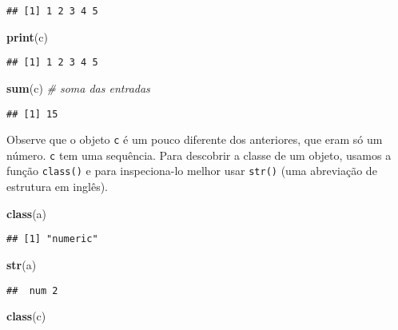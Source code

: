 \documentclass[]{article}
\newenvironment{Shaded}{\begin{snugshade}}{\end{snugshade}}
\newcommand{\CommentTok}[1]{\textcolor[rgb]{0.56,0.35,0.01}{\textit{#1}}}
\newcommand{\KeywordTok}[1]{\textcolor[rgb]{0.13,0.29,0.53}{\textbf{#1}}}
\newcommand{\NormalTok}[1]{#1}
\begin{document}
\begin{verbatim}
## [1] 1 2 3 4 5
\end{verbatim}

\begin{Shaded}
\begin{Highlighting}[]
\KeywordTok{print}\NormalTok{(c)}
\end{Highlighting}
\end{Shaded}

\begin{verbatim}
## [1] 1 2 3 4 5
\end{verbatim}

\begin{Shaded}
\begin{Highlighting}[]
\KeywordTok{sum}\NormalTok{(c) }\CommentTok{# soma das entradas}
\end{Highlighting}
\end{Shaded}

\begin{verbatim}
## [1] 15
\end{verbatim}

Observe que o objeto \texttt{c} é um pouco diferente dos anteriores, que
eram só um número. \texttt{c} tem uma sequência. Para descobrir a classe
de um objeto, usamos a função \texttt{class()} e para inspeciona-lo
melhor usar \texttt{str()} (uma abreviação de estrutura em inglês).

\begin{Shaded}
\begin{Highlighting}[]
\KeywordTok{class}\NormalTok{(a)}
\end{Highlighting}
\end{Shaded}

\begin{verbatim}
## [1] "numeric"
\end{verbatim}

\begin{Shaded}
\begin{Highlighting}[]
\KeywordTok{str}\NormalTok{(a)}
\end{Highlighting}
\end{Shaded}

\begin{verbatim}
##  num 2
\end{verbatim}

\begin{Shaded}
\begin{Highlighting}[]
\KeywordTok{class}\NormalTok{(c)}
\end{Highlighting}
\end{Shaded}
\end{document}
